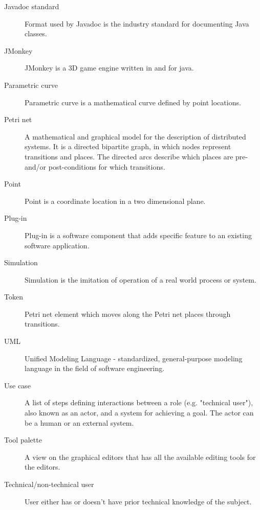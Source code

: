\begin{description}
\item [Javadoc standard] Format used by Javadoc is the industry standard for documenting Java classes.

\item [JMonkey] JMonkey is a 3D game engine written in and for java.

\item [Parametric curve] Parametric curve is a mathematical curve defined by point locations.

\item [Petri net] A mathematical and graphical model for the description of distributed systems. It is a directed bipartite graph, in which nodes represent transitions and places. The directed arcs describe which places are pre- and/or post-conditions for which transitions.

\item [Point] Point is a coordinate location in a two dimensional plane.

\item [Plug-in] Plug-in is a software component that adds specific feature to an existing software application.

\item [Simulation] Simulation is the imitation of operation of a real world process or system.

\item [Token] Petri net element which moves along the Petri net places through transitions.

\item [UML] Unified Modeling Language - standardized, general-purpose modeling language in the field of software engineering.

\item [Use case] A list of steps defining interactions between a role (e.g. "technical user"), also known as an actor, and a system for achieving a goal. The actor can be a human or an external system.

\item [Tool palette] A view on the graphical editors that has all the available editing tools for the editors.

\item [Technical/non-technical user] User either has or doesn't have prior technical knowledge of the subject.



 \end{description}
